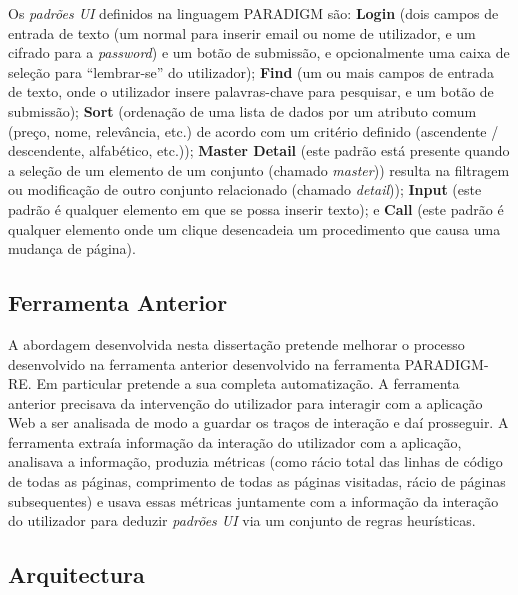 \documentclass[9pt,a4paper]{extarticle}
\begin{document}
\begin{multicols}{2}
Os \textit{padrões UI} definidos na linguagem PARADIGM são: \textbf{Login} (dois campos de entrada de texto (um normal para inserir email ou nome de utilizador, e um cifrado para a \textit{password}) e um botão de submissão, e opcionalmente uma caixa de seleção para ``lembrar-se'' do utilizador); \textbf{Find} (um ou mais campos de entrada de texto, onde o utilizador insere palavras-chave para pesquisar, e um botão de submissão); \textbf{Sort} (ordenação de uma lista de dados por um atributo comum (preço, nome, relevância, etc.) de acordo com um critério definido (ascendente / descendente, alfabético, etc.)); \textbf{Master Detail} (este padrão está presente quando a seleção de um elemento de um conjunto (chamado \textit{master})) resulta na filtragem ou modificação de outro conjunto relacionado (chamado \textit{detail})); \textbf{Input} (este padrão é qualquer elemento em que se possa inserir texto); e \textbf{Call} (este padrão é qualquer elemento onde um clique desencadeia um procedimento que causa uma mudança de página).

\subsection{Ferramenta Anterior}
A abordagem desenvolvida nesta dissertação pretende melhorar o processo desenvolvido na ferramenta anterior \cite{nabuco2013inferring} desenvolvido na ferramenta PARADIGM-RE. Em particular pretende a sua completa automatização. A ferramenta anterior precisava da intervenção do utilizador para interagir com a aplicação Web a ser analisada de modo a guardar os traços de interação e daí prosseguir. A ferramenta extraía informação da interação do utilizador com a aplicação, analisava a informação, produzia métricas (como rácio total das linhas de código de todas as páginas, comprimento de todas as páginas visitadas, rácio de páginas subsequentes) e usava essas métricas juntamente com a informação da interação do utilizador para deduzir \textit{padrões UI} via um conjunto de regras heurísticas.

\subsection{Arquitectura}


\end{multicols}
\end{document}
